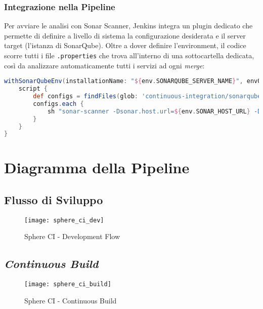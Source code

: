 \documentclass[../main.tex]{subfiles}
\begin{document}
        	    \subsubsection{Integrazione nella Pipeline}
        	    
        	        Per avviare le analisi con Sonar Scanner, Jenkins integra un plugin dedicato che permette di definire a livello di sistema la configurazione desiderata e il server target (l'istanza di SonarQube). Oltre a dover definire l'environment, il codice scorre tutti i file \verb|.properties| che trova all'interno di una sottocartella dedicata, così da analizzare automaticamente tutti i servizi ad ogni \emph{merge}:
        	        \begin{lstlisting}[language=Groovy]
withSonarQubeEnv(installationName: "${env.SONARQUBE_SERVER_NAME}", envOnly: true) {
    script {
        def configs = findFiles(glob: 'continuous-integration/sonarqube/*.properties')
        configs.each {
            sh "sonar-scanner -Dsonar.host.url=${env.SONAR_HOST_URL} -Dsonar.login=${env.SONAR_AUTH_TOKEN} -Dproject.settings=${it}"
        }
    }
}
        	        \end{lstlisting}

    	\section{Diagramma della Pipeline}
    	
    	    \subsection{Flusso di Sviluppo}
    	    
    	        \begin{figure}[H]
        			\centering
        			\texttt{[image: sphere\_ci\_dev]}
        			\caption{Sphere CI - Development Flow}
        			\label{fig:sphere_ci_dev}
    	        \end{figure}
    	
    	    \subsection{\emph{Continuous Build}}
    	    
    	        \begin{figure}[H]
        			\centering
        			\texttt{[image: sphere\_ci\_build]}
        			\caption{Sphere CI - Continuous Build}
        			\label{fig:sphere_ci_build}
    	        \end{figure}
    	        
\end{document}
